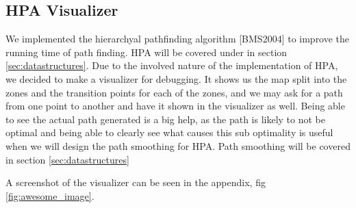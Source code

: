 \subsection{HPA Visualizer}
We implemented the hierarchyal pathfinding algorithm [BMS2004] to improve the running time of path finding. HPA will be covered under in section \ref{sec:datastructures}. Due to the involved nature of the implementation of HPA, we decided to make a visualizer for debugging. It shows us the map split into the zones and the transition points for each of the zones, and we may ask for a path from one point to another and have it shown in the visualizer as well. Being able to see the actual path generated is a big help, as the path is likely to not be optimal and being able to clearly see what causes this sub optimality is useful when we will design the path smoothing for HPA. Path smoothing will be covered in section \ref{sec:datastructures}

A screenshot of the visualizer can be seen in the appendix, fig \ref{fig:awesome_image}.